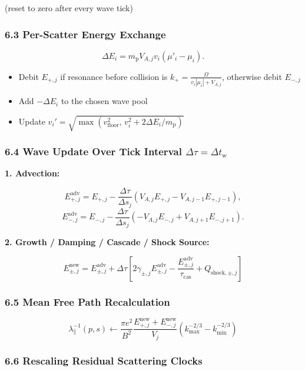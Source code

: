 {(reset to zero after every wave tick)

\subsubsection*{6.3 Per-Scatter Energy Exchange}

\[
\Delta E_i = m_{\mathrm{p}} V_{A,j} v_i (\mu'_i - \mu_i).
\]

\begin{itemize}
  \item Debit \( E_{+,j} \) if resonance before collision is \( k_+ = \frac{\Omega}{v_i |\mu_i| + V_{A,j}} \), otherwise debit \( E_{-,j} \)
  \item Add \( -\Delta E_i \) to the chosen wave pool
  \item Update \( v_i' = \sqrt{\max(v_{\text{floor}}^2,\, v_i^2 + 2\Delta E_i / m_{\mathrm{p}})} \)
\end{itemize}

\subsubsection*{6.4 Wave Update Over Tick Interval \( \Delta \tau = \Delta t_{\mathrm{w}} \)}

\textbf{1. Advection:}

\[
E_{+,j}^{\text{adv}} = E_{+,j} - \frac{\Delta \tau}{\Delta s_j}(V_{A,j} E_{+,j} - V_{A,j-1} E_{+,j-1}),
\]
\[
E_{-,j}^{\text{adv}} = E_{-,j} - \frac{\Delta \tau}{\Delta s_j}(-V_{A,j} E_{-,j} + V_{A,j+1} E_{-,j+1}).
\]

\textbf{2. Growth / Damping / Cascade / Shock Source:}

\[
E_{\pm,j}^{\text{new}} = E_{\pm,j}^{\text{adv}} + \Delta \tau \left[2\gamma_{\pm,j} E_{\pm,j}^{\text{adv}} - \frac{E_{\pm,j}^{\text{adv}}}{\tau_{\text{cas}}} + Q_{\text{shock},\pm,j}\right]
\]

\subsubsection*{6.5 Mean Free Path Recalculation}

\[
\lambda_{\parallel}^{-1}(p,s) \leftarrow \frac{\pi e^2}{B^2} \frac{E_{+,j}^{\text{new}} + E_{-,j}^{\text{new}}}{V_j} (k_{\max}^{-2/3} - k_{\min}^{-2/3})
\]

\subsubsection*{6.6 Rescaling Residual Scattering Clocks}

}
